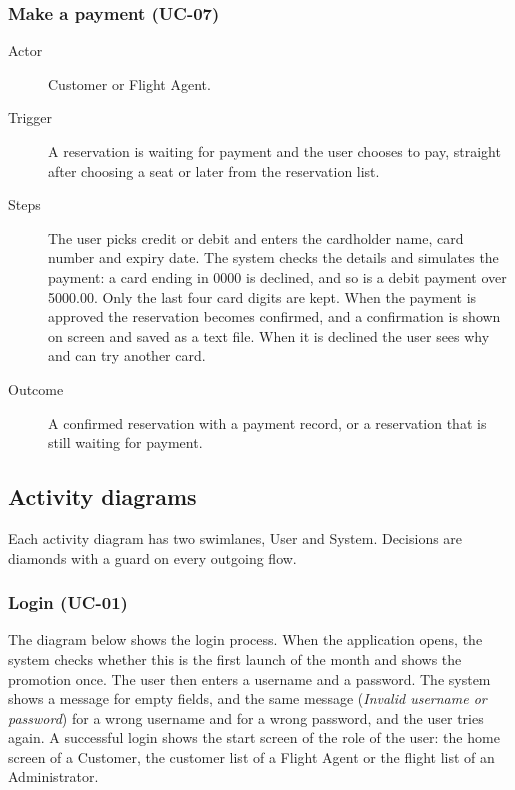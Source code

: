 \subsubsection*{Make a payment (UC-07)}

\begin{description}
\item[Actor] Customer or Flight Agent.
\item[Trigger] A reservation is waiting for payment and the user chooses to
  pay, straight after choosing a seat or later from the reservation list.
\item[Steps] The user picks credit or debit and enters the cardholder name,
  card number and expiry date. The system checks the details and simulates the
  payment: a card ending in 0000 is declined, and so is a debit payment over
  5000.00. Only the last four card digits are kept. When the payment is
  approved the reservation becomes confirmed, and a confirmation is shown on
  screen and saved as a text file. When it is declined the user sees why and
  can try another card.
\item[Outcome] A confirmed reservation with a payment record, or a reservation
  that is still waiting for payment.
\end{description}

\subsection*{Activity diagrams}

Each activity diagram has two swimlanes, User and System. Decisions are
diamonds with a guard on every outgoing flow.

\subsubsection*{Login (UC-01)}

The diagram below shows the login process. When the application
opens, the system checks whether this is the first launch of the month and
shows the promotion once. The user then enters a username and a password. The
system shows a message for empty fields, and the same message
(\emph{Invalid username or password}) for a wrong username and for a wrong
password, and the user tries again. A successful login shows the start screen
of the role of the user: the home screen of a Customer, the customer list of a
Flight Agent or the flight list of an Administrator.



